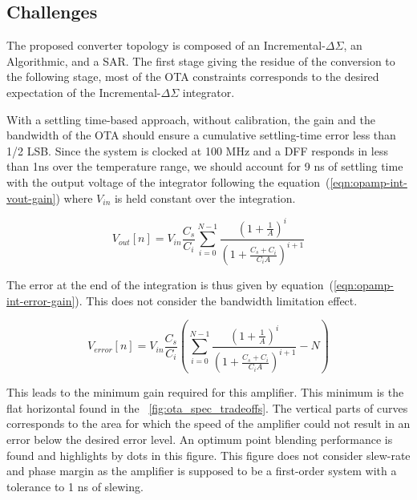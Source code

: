     \subsection{Challenges}                      %
The proposed converter topology is composed of an Incremental-\(\Delta\Sigma \), an Algorithmic, and a SAR\@. The first stage giving the residue of the conversion to the following stage, most of the OTA constraints corresponds to the desired expectation of the Incremental-\(\Delta\Sigma \) integrator.

With a settling time-based approach, without calibration, the gain and the bandwidth of the OTA should ensure a cumulative settling-time error less than 1/2 LSB\@. Since the system is clocked at 100 MHz and a DFF responds in less than 1ns over the temperature range, we should account for 9 ns of settling time with the output voltage of the integrator following the equation~(\ref{eqn:opamp-int-vout-gain}) where \(V_{in} \) is held constant over the integration.

\begin{equation}
\label{eqn:opamp-int-vout-gain}
V_{out}[n] = V_{in} \frac{C_s}{C_i}\sum_{i=0}^{N-1}\frac{{\left(1+\frac{1}{A} \right)}^i}{{\left(1+\frac{C_s+C_i}{C_i A} \right)}^{i+1}}
\end{equation}

The error at the end of the integration is thus given by equation~(\ref{eqn:opamp-int-error-gain}). This does not consider the bandwidth limitation effect.

\begin{equation}
\label{eqn:opamp-int-error-gain}
V_{error}[n] = V_{in} \frac{C_s}{C_i} \left( \sum_{i=0}^{N-1}\frac{{\left(1+\frac{1}{A} \right)}^i}{{\left(1+\frac{C_s+C_i}{C_i A} \right)}^{i+1}} - N \right)
\end{equation}

This leads to the minimum gain required for this amplifier. This minimum is the flat horizontal found in the \figurename~\ref{fig:ota_spec_tradeoffs}. The vertical parts of curves corresponds to the area for which the speed of the amplifier could not result in an error below the desired error level. An optimum point blending performance is found and highlights by dots in this figure. This figure does not consider slew-rate and phase margin as the amplifier is supposed to be a first-order system with a tolerance to 1 ns of slewing.

